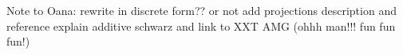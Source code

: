 \documentclass{sig-alternate}
\begin{document}
Note to Oana: rewrite in discrete form?? or not
add projections description and reference
explain additive schwarz and link to XXT AMG (ohhh man!!! fun fun fun!)

\end{document}
